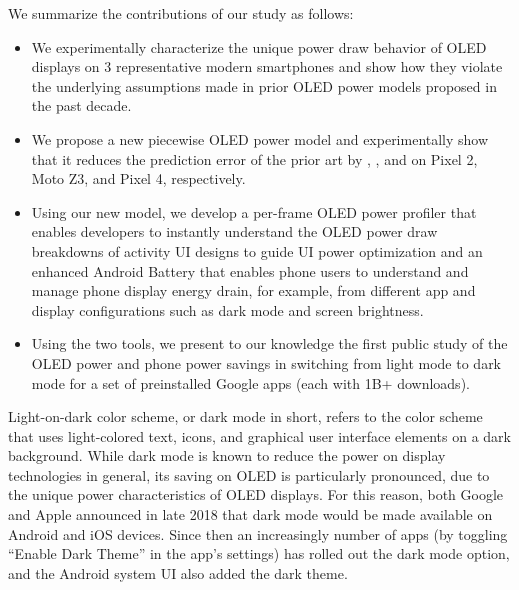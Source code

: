 

We summarize the contributions of our study as follows:
\begin{itemize}[leftmargin=*]
  \item We experimentally characterize the unique power draw behavior
    of OLED displays on 3 representative modern smartphones and show
    how they violate the underlying assumptions made in prior OLED
    power models proposed in the past decade.
  \item We propose a new piecewise OLED power model and experimentally
    show that it reduces the prediction error of the prior art by 
    \pixeltwoerrorreduction,
    \motozthreeerrorreduction, and
    \pixelfourerrorreduction
    on Pixel 2, Moto Z3, and Pixel 4, respectively.
  \item Using our new model, we develop a per-frame OLED
    power profiler that enables developers to instantly understand the
    OLED power draw breakdowns of activity UI designs to guide UI power optimization and an enhanced Android Battery that enables phone users to
understand and manage phone
display energy drain, for example, from different app and display
configurations such as dark mode and screen brightness.
  \item Using the two tools, we present to our knowledge
    the first public study of the OLED power and phone power
    savings in switching from light mode to dark mode for a
    set of preinstalled Google apps {(each with 1B+ downloads).}
  \end{itemize}




Light-on-dark color scheme, or dark mode in short, refers to the color
scheme that uses light-colored text, icons, and graphical user
interface elements on a dark background.  While dark mode
is known to reduce the power on display technologies in general,
its saving on OLED is particularly pronounced, due to the unique power
characteristics of OLED displays.  For this reason, both Google and
Apple announced in late 2018 that dark mode would be made available on
Android and iOS devices. Since then an increasingly number of apps
(by toggling ``Enable Dark Theme'' in the app's settings) has rolled out
the dark mode option, and the Android system UI also added the dark
theme.


